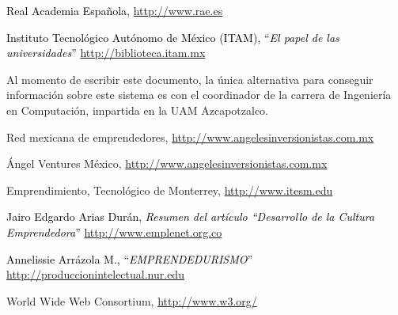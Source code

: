 \documentclass[11pt,letterpaper,titlepage]{article}
\begin{document}
\begin{thebibliography}{99}
 \textcolor{black}{Real Academia Espa\~nola, \href{http://www.rae.es}{http://www.rae.es}}

 \textcolor{black}{Instituto Tecnol\'ogico Aut\'onomo de M\'exico (ITAM), ``\textit{El papel de las universidades}'' \href{http://biblioteca.itam.mx/estudios/estudio/letras39-40/texto10/sec\_2.html}{http://biblioteca.itam.mx} } 

\bibitem{*} Al momento de escribir este documento, la \'unica alternativa para conseguir informaci\'on sobre este sistema es con el coordinador de la carrera de Ingenier\'ia en Computaci\'on, impartida en la UAM Azcapotzalco.


 Red mexicana de emprendedores, \href{http://www.angelesinversionistas.com.mx}{http://www.angelesinversionistas.com.mx}

 \'Angel Ventures M\'exico, \href{http://www.angelesinversionistas.com.mx}{http://www.angelesinversionistas.com.mx}


 Emprendimiento, Tecnol\'ogico de Monterrey, \href{http://www.itesm.edu/wps/wcm/connect/ITESM/Tecnologico+de+Monterrey/Emprendimiento/#2}{http://www.itesm.edu}


 \textcolor{black}{Jairo Edgardo Arias Dur\'an, \textit{Resumen del art\'iculo ``Desarrollo de la Cultura Emprendedora}'' \href{http://www.emplenet.org.co/roce/documentos/desarrollo\%20de\%20la\%20cultura\%20emprendedora.pdf}{http://www.emplenet.org.co}}

 \textcolor{black}{Annelissie Arr\'azola M., ``\textit{EMPRENDEDURISMO}'' \href{http://produccionintelectual.nur.edu/archivos/emprendedurismo.pdf}{http://produccionintelectual.nur.edu}}







 World Wide Web Consortium, \href{http://www.w3.org/}{http://www.w3.org/}


\end{thebibliography}
\end{document}
